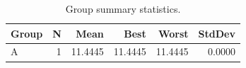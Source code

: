 \begin{table}[htbp]
\centering
\caption{Group summary statistics.}
\label{tab:group_summary}
\begin{tabular}{lrrrrr}
\toprule
\textbf{Group} & \textbf{N} & \textbf{Mean} & \textbf{Best} & \textbf{Worst} & \textbf{StdDev} \\
\midrule
A & 1 & 11.4445 & 11.4445 & 11.4445 & 0.0000 \\
\bottomrule
\end{tabular}
\end{table}